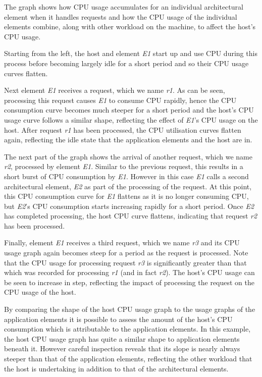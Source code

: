 The graph shows how CPU usage accumulates for an individual architectural element when it handles requests and how the CPU usage of the individual elements combine, along with other workload on the machine, to affect the host's CPU usage.

Starting from the left, the host and element \emph{E1} start up and use CPU during this process before becoming largely idle for a short period and so their CPU usage curves flatten.

Next element \emph{E1} receives a request, which we name \emph{r1}.  As can be seen, processing this request causes \emph{E1} to consume CPU rapidly, hence the CPU consumption curve becomes much steeper for a short period and the host's CPU usage curve follows a similar shape, reflecting the effect of \emph{E1}'s CPU usage on the host.  After request \emph{r1} has been processed, the CPU utilisation curves flatten again, reflecting the idle state that the application elements and the host are in.

The next part of the graph shows the arrival of another request, which we name \emph{r2}, processed by element \emph{E1}.  Similar to the previous request, this results in a short burst of CPU consumption by \emph{E1}.  However in this case \emph{E1} calls a second architectural element, \emph{E2} as part of the processing of the request.  At this point, this CPU consumption curve for \emph{E1} flattens as it is no longer consuming CPU, but \emph{E2}'s CPU consumption starts increasing rapidly for a short period.  Once \emph{E2} has completed processing, the host CPU curve flattens, indicating that request \emph{r2} has been processed.

Finally, element \emph{E1} receives a third request, which we name \emph{r3} and its CPU usage graph again becomes steep for a period as the request is processed.  Note that the CPU usage for processing request \emph{r3} is significantly greater than that which was recorded for processing \emph{r1} (and in fact \emph{r2}).  The host's CPU usage can be seen to increase in step, reflecting the impact of processing the request on the CPU usage of the host.

By comparing the shape of the host CPU usage graph to the usage graphs of the application elements it is possible to assess the amount of the host's CPU consumption which is attributable to the application elements.  In this example, the host CPU usage graph has quite a similar shape to application elements beneath it.  However careful inspection reveals that its slope is nearly always steeper than that of the application elements, reflecting the other workload that the host is undertaking in addition to that of the architectural elements.  

